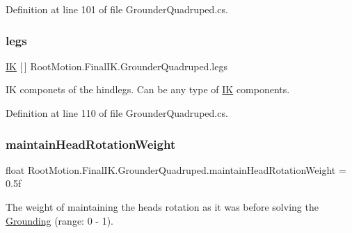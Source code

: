 Definition at line 101 of file Grounder\+Quadruped.\+cs.

\mbox{\label{class_root_motion_1_1_final_i_k_1_1_grounder_quadruped_a9730d74e7b4337aae310d93e3d69061a}} 
\subsubsection{\texorpdfstring{legs}{legs}}
{\footnotesize\ttfamily \mbox{\hyperlink{class_root_motion_1_1_final_i_k_1_1_i_k}{IK}} \mbox{[}$\,$\mbox{]} Root\+Motion.\+Final\+I\+K.\+Grounder\+Quadruped.\+legs}



IK componets of the hindlegs. Can be any type of \mbox{\hyperlink{class_root_motion_1_1_final_i_k_1_1_i_k}{IK}} components. 



Definition at line 110 of file Grounder\+Quadruped.\+cs.

\mbox{\label{class_root_motion_1_1_final_i_k_1_1_grounder_quadruped_aac90017fa140ce1a04a24b55f2fd88be}} 
\subsubsection{\texorpdfstring{maintain\+Head\+Rotation\+Weight}{maintainHeadRotationWeight}}
{\footnotesize\ttfamily float Root\+Motion.\+Final\+I\+K.\+Grounder\+Quadruped.\+maintain\+Head\+Rotation\+Weight = 0.\+5f}



The weight of maintaining the head\textquotesingle{}s rotation as it was before solving the \mbox{\hyperlink{class_root_motion_1_1_final_i_k_1_1_grounding}{Grounding}} (range\+: 0 -\/ 1). 



